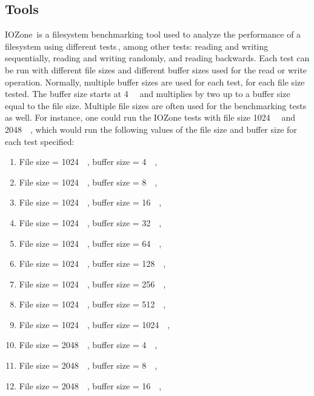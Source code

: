 \begin{enumerate}
\subsection{Tools}
IOZone\,\cite{IozoneFilesystemBenchmark} is a filesystem benchmarking tool used to analyze the performance of a filesystem using different tests\,\cite{iozoneIozoneFilesystemBenchmark}, among other tests: reading and writing sequentially, reading and writing randomly, and reading backwards. Each test can be run with different file sizes and different buffer sizes used for the read or write operation. Normally, multiple buffer sizes are used for each test, for each file size tested. The buffer size starts at \SI{4}{\kilo\byte} and multiplies by two up to a buffer size equal to the file size. Multiple file sizes are often used for the benchmarking tests as well. For instance, one could run the IOZone tests with file size \SI{1024}{\kilo\byte} and \SI{2048}{\kilo\byte}, which would run the following values of the file size and buffer size for each test specified:
\begin{enumerate}
	\item File size = \SI{1024}{\kilo\byte}, buffer size = \SI{4}{\kilo\byte},
	\item File size = \SI{1024}{\kilo\byte}, buffer size = \SI{8}{\kilo\byte},
	\item File size = \SI{1024}{\kilo\byte}, buffer size = \SI{16}{\kilo\byte},
	\item File size = \SI{1024}{\kilo\byte}, buffer size = \SI{32}{\kilo\byte},
	\item File size = \SI{1024}{\kilo\byte}, buffer size = \SI{64}{\kilo\byte},
	\item File size = \SI{1024}{\kilo\byte}, buffer size = \SI{128}{\kilo\byte},
	\item File size = \SI{1024}{\kilo\byte}, buffer size = \SI{256}{\kilo\byte},
	\item File size = \SI{1024}{\kilo\byte}, buffer size = \SI{512}{\kilo\byte},
	\item File size = \SI{1024}{\kilo\byte}, buffer size = \SI{1024}{\kilo\byte},
	\item File size = \SI{2048}{\kilo\byte}, buffer size = \SI{4}{\kilo\byte},
	\item File size = \SI{2048}{\kilo\byte}, buffer size = \SI{8}{\kilo\byte},
	\item File size = \SI{2048}{\kilo\byte}, buffer size = \SI{16}{\kilo\byte},

\end{enumerate}
\end{enumerate}
